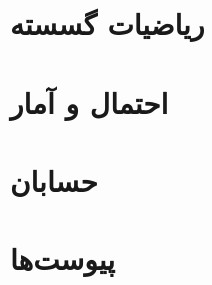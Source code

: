 \documentclass[a4paper,12pt,twoside]{book}
\begin{document}
	\part{ریاضیات گسسته}
	
	
	
	
	\part{احتمال و آمار}
	
	
	
	\part{حسابان}
	
	
	
	
	\backmatter
	\appendix
	\renewcommand{\thechapter}{}
	\part{پیوست‌ها}
	
	
	
	
	
\end{document}
